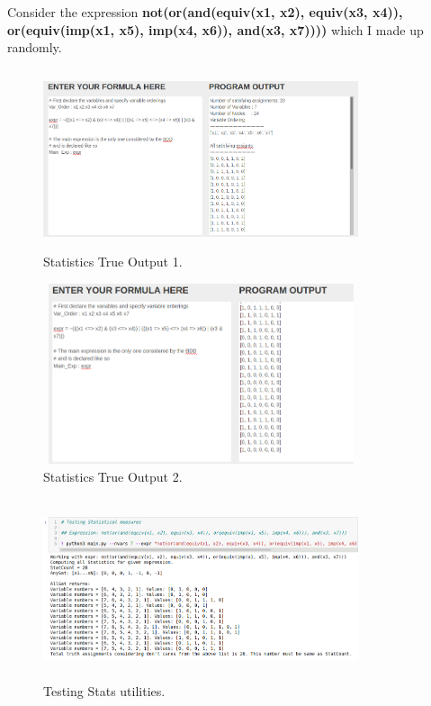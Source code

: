 \documentclass[a4paper, titlepage, 12pt]{article}
\numberwithin{equation}{section}
\begin{document}
\begin{itemize}
                    Consider the expression \textbf{not(or(and(equiv(x1, x2), equiv(x3, x4)), or(equiv(imp(x1, x5), imp(x4, x6)), and(x3, x7))))} which I made up randomly.

                    \begin{figure}[htp]
                        \centering
                        \includegraphics[height=200px, width=350px]{img/test_stats_true_1.png}
                        \caption{Statistics True Output 1.}
                        \label{fig:test_stats_true_1}
                    \end{figure}

                    \begin{figure}[htp]
                        \centering
                        \includegraphics[height=200px, width=350px]{img/test_stats_true_2.png}
                        \caption{Statistics True Output 2.}
                        \label{fig:test_stats_true_2}
                    \end{figure}

                    \begin{figure}[htp]
                        \centering
                        \includegraphics[height=200px, width=350px]{img/test_stats.png}
                        \caption{Testing Stats utilities.}
                        \label{fig:test_stats}
                    \end{figure}


\end{itemize}
\end{document}
